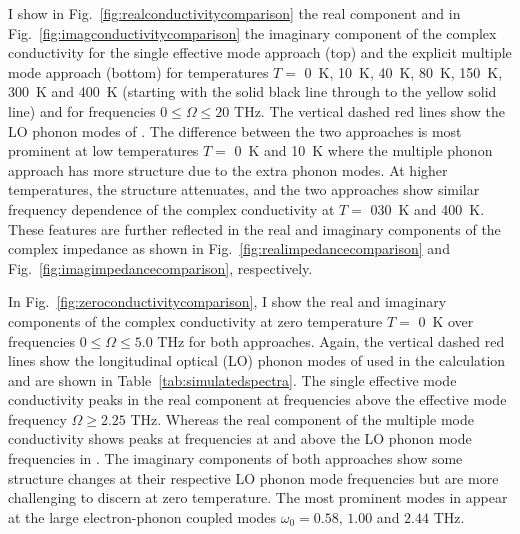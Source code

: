 I show in Fig.~\ref{fig:realconductivitycomparison} the real component and in Fig.~\ref{fig:imagconductivitycomparison} the imaginary component of the complex conductivity for the single effective mode approach (top) and the explicit multiple mode approach (bottom) for temperatures $T = $ \SI{0}{\kelvin}, \SI{10}{\kelvin}, \SI{40}{\kelvin}, \SI{80}{\kelvin}, \SI{150}{\kelvin}, \SI{300}{\kelvin} and \SI{400}{\kelvin} (starting with the solid black line through to the yellow solid line) and for frequencies $0 \leq \Omega \leq 20$ THz. The vertical dashed red lines show the LO phonon modes of . The difference between the two approaches is most prominent at low temperatures $T = $ \SI{0}{\kelvin} and \SI{10}{\kelvin} where the multiple phonon approach has more structure due to the extra phonon modes. At higher temperatures, the structure attenuates, and the two approaches show similar frequency dependence of the complex conductivity at $T = $ \SI{030}{\kelvin} and \SI{400}{\kelvin}. These features are further reflected in the real and imaginary components of the complex impedance as shown in Fig.~\ref{fig:realimpedancecomparison} and Fig.~\ref{fig:imagimpedancecomparison}, respectively.

In Fig.~\ref{fig:zeroconductivitycomparison}, I show the real and imaginary components of the complex conductivity at zero temperature $T = $ \SI{0}{\kelvin} over frequencies $0 \leq \Omega \leq 5.0$ THz for both approaches. Again, the vertical dashed red lines show the longitudinal optical (LO) phonon modes of  used in the calculation and are shown in Table~\ref{tab:simulatedspectra}. The single effective mode conductivity peaks in the real component at frequencies above the effective mode frequency $\Omega \geq 2.25$ THz. 
Whereas the real component of the multiple mode conductivity shows peaks at frequencies at and above the LO phonon mode frequencies in . 
The imaginary components of both approaches show some structure changes at their respective LO phonon mode frequencies but are more challenging to discern at zero temperature. 
The most prominent modes in  appear at the large electron-phonon coupled modes $\omega_0 = 0.58$, $1.00$ and $2.44$ THz.

